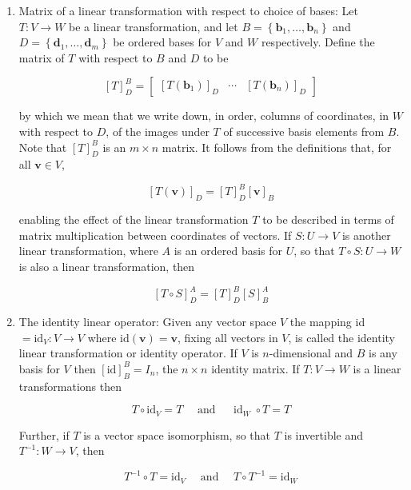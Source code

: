 \documentclass{article}
\begin{document}
\begin{enumerate}
        \item  Matrix of a linear transformation with respect to choice of bases: Let $T: V \rightarrow W$ be a linear transformation, and let $B=\left\{\mathbf{b}_{1}, \ldots, \mathbf{b}_{n}\right\}$ and $D=\left\{\mathbf{d}_{1}, \ldots, \mathbf{d}_{m}\right\}$ be ordered bases for $V$ and $W$ respectively. Define the matrix of $T$ with respect to $B$ and $D$ to be

        $$
        [T]_{D}^{B}=\left[\begin{array}{lll}
        {\left[T\left(\mathbf{b}_{1}\right)\right]_{D}} & \cdots & {\left[T\left(\mathbf{b}_{n}\right)\right]_{D}}
        \end{array}\right]
        $$

        by which we mean that we write down, in order, columns of coordinates, in $W$ with respect to $D$, of the images under $T$ of successive basis elements from $B$. Note that $[T]_{D}^{B}$ is an $m \times n$ matrix. It follows from the definitions that, for all $\mathbf{v} \in V$,

        $$
        [T(\mathbf{v})]_{D}=[T]_{D}^{B}[\mathbf{v}]_{B}
        $$

        enabling the effect of the linear transformation $T$ to be described in terms of matrix multiplication between coordinates of vectors. If $S: U \rightarrow V$ is another linear transformation, where $A$ is an ordered basis for $U$, so that $T \circ S: U \rightarrow W$ is also a linear transformation, then

        $$
        [T \circ S]_{D}^{A}=[T]_{D}^{B}[S]_{B}^{A}
        $$

        \item The identity linear operator: Given any vector space $V$ the mapping id $=\mathrm{id}_{V}: V \rightarrow V$ where $\mathrm{id}(\mathbf{v})=\mathbf{v}$, fixing all vectors in $V$, is called the identity linear transformation or identity operator. If $V$ is $n$-dimensional and $B$ is any basis for $V$ then $[\mathrm{id}]_{B}^{B}=I_{n}$, the $n \times n$ identity matrix. If $T: V \rightarrow W$ is a linear transformations then

        $$
        T \circ \mathrm{id}_{V}=T \quad \text { and } \quad \operatorname{id}_{W} \circ T=T
        $$

        Further, if $T$ is a vector space isomorphism, so that $T$ is invertible and $T^{-1}: W \rightarrow V$, then

        $$
        T^{-1} \circ T=\mathrm{id}_{V} \quad \text { and } \quad T \circ T^{-1}=\mathrm{id}_{W}
        $$


\end{enumerate}
\end{document}
